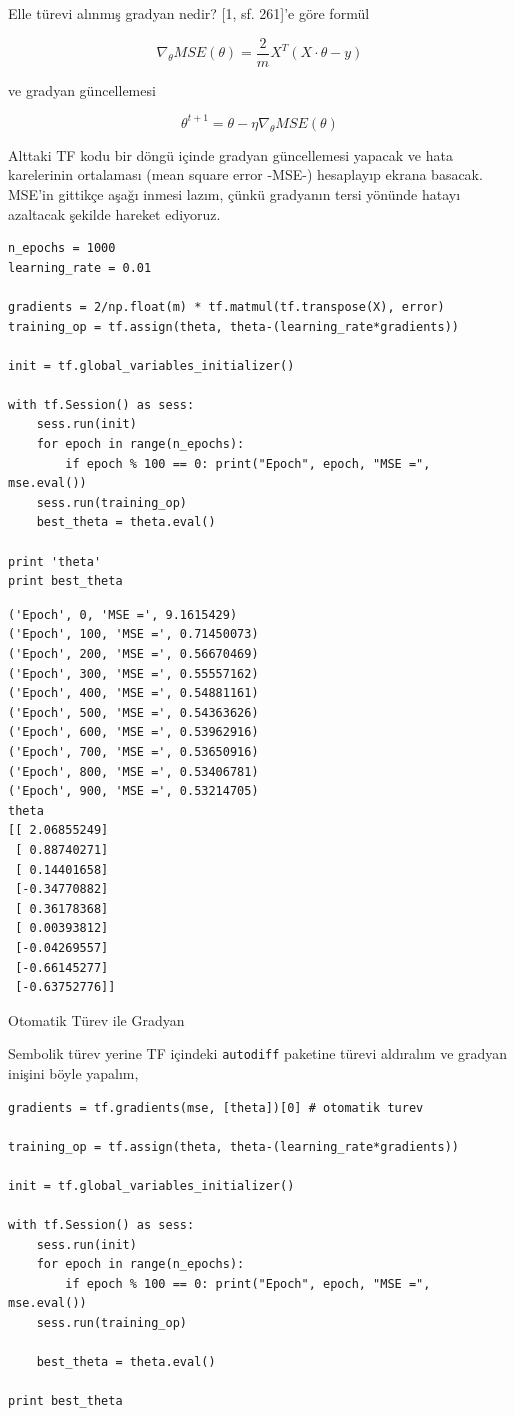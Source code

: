 \documentclass[12pt,fleqn]{article}\usepackage{../../common}
\begin{document}
Elle türevi alınmış gradyan nedir? [1, sf. 261]'e göre formül

$$ 
\nabla_\theta MSE(\theta) = \frac{2}{m} X^T (X \cdot \theta - y)
$$  

ve gradyan güncellemesi

$$ 
\theta^{t+1} = \theta - \eta \nabla_\theta MSE(\theta)
$$

Alttaki TF kodu bir döngü içinde gradyan güncellemesi yapacak ve hata
karelerinin ortalaması (mean square error -MSE-) hesaplayıp ekrana
basacak. MSE'in gittikçe aşağı inmesi lazım, çünkü gradyanın tersi yönünde
hatayı azaltacak şekilde hareket ediyoruz. 

\begin{verbatim}
n_epochs = 1000
learning_rate = 0.01

gradients = 2/np.float(m) * tf.matmul(tf.transpose(X), error)
training_op = tf.assign(theta, theta-(learning_rate*gradients))

init = tf.global_variables_initializer()

with tf.Session() as sess:
    sess.run(init)
    for epoch in range(n_epochs):
        if epoch % 100 == 0: print("Epoch", epoch, "MSE =", mse.eval())
	sess.run(training_op)    
    best_theta = theta.eval()
    
print 'theta'
print best_theta
\end{verbatim}

\begin{verbatim}
('Epoch', 0, 'MSE =', 9.1615429)
('Epoch', 100, 'MSE =', 0.71450073)
('Epoch', 200, 'MSE =', 0.56670469)
('Epoch', 300, 'MSE =', 0.55557162)
('Epoch', 400, 'MSE =', 0.54881161)
('Epoch', 500, 'MSE =', 0.54363626)
('Epoch', 600, 'MSE =', 0.53962916)
('Epoch', 700, 'MSE =', 0.53650916)
('Epoch', 800, 'MSE =', 0.53406781)
('Epoch', 900, 'MSE =', 0.53214705)
theta
[[ 2.06855249]
 [ 0.88740271]
 [ 0.14401658]
 [-0.34770882]
 [ 0.36178368]
 [ 0.00393812]
 [-0.04269557]
 [-0.66145277]
 [-0.63752776]]
\end{verbatim}

Otomatik Türev ile Gradyan

Sembolik türev yerine TF içindeki \verb!autodiff! paketine türevi aldıralım
ve gradyan inişini böyle yapalım,

\begin{verbatim}
gradients = tf.gradients(mse, [theta])[0] # otomatik turev

training_op = tf.assign(theta, theta-(learning_rate*gradients))

init = tf.global_variables_initializer()

with tf.Session() as sess:
    sess.run(init)
    for epoch in range(n_epochs):
        if epoch % 100 == 0: print("Epoch", epoch, "MSE =", mse.eval())
	sess.run(training_op)
    
    best_theta = theta.eval()
    
print best_theta
\end{verbatim}
\end{document}

